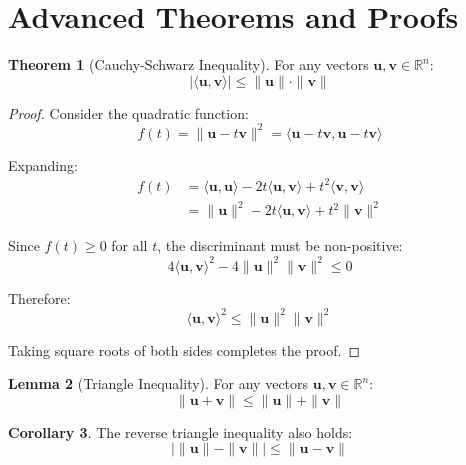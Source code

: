 \documentclass[11pt,a4paper]{article}
\theoremstyle{definition}
\newtheorem{theorem}{Theorem}[section]
\newtheorem{lemma}[theorem]{Lemma}
\newtheorem{corollary}[theorem]{Corollary}
\begin{document}
\section{Advanced Theorems and Proofs}
\label{sec:theorems}

\begin{theorem}[Cauchy-Schwarz Inequality]
For any vectors $\mathbf{u}, \mathbf{v} \in \mathbb{R}^n$:
\begin{equation}
    |\langle \mathbf{u}, \mathbf{v} \rangle| \leq \|\mathbf{u}\| \cdot \|\mathbf{v}\|
\end{equation}
\end{theorem}

\begin{proof}
Consider the quadratic function:
\begin{equation}
    f(t) = \|\mathbf{u} - t\mathbf{v}\|^2 = \langle \mathbf{u} - t\mathbf{v}, \mathbf{u} - t\mathbf{v} \rangle
\end{equation}

Expanding:
\begin{align}
    f(t) &= \langle \mathbf{u}, \mathbf{u} \rangle - 2t\langle \mathbf{u}, \mathbf{v} \rangle + t^2\langle \mathbf{v}, \mathbf{v} \rangle \\
    &= \|\mathbf{u}\|^2 - 2t\langle \mathbf{u}, \mathbf{v} \rangle + t^2\|\mathbf{v}\|^2
\end{align}

Since $f(t) \geq 0$ for all $t$, the discriminant must be non-positive:
\begin{equation}
    4\langle \mathbf{u}, \mathbf{v} \rangle^2 - 4\|\mathbf{u}\|^2\|\mathbf{v}\|^2 \leq 0
\end{equation}

Therefore:
\begin{equation}
    \langle \mathbf{u}, \mathbf{v} \rangle^2 \leq \|\mathbf{u}\|^2\|\mathbf{v}\|^2
\end{equation}

Taking square roots of both sides completes the proof.
\end{proof}

\begin{lemma}[Triangle Inequality]
For any vectors $\mathbf{u}, \mathbf{v} \in \mathbb{R}^n$:
\begin{equation}
    \|\mathbf{u} + \mathbf{v}\| \leq \|\mathbf{u}\| + \|\mathbf{v}\|
\end{equation}
\end{lemma}

\begin{corollary}
The reverse triangle inequality also holds:
\begin{equation}
    |\|\mathbf{u}\| - \|\mathbf{v}\|| \leq \|\mathbf{u} - \mathbf{v}\|
\end{equation}
\end{corollary}
\end{document}
